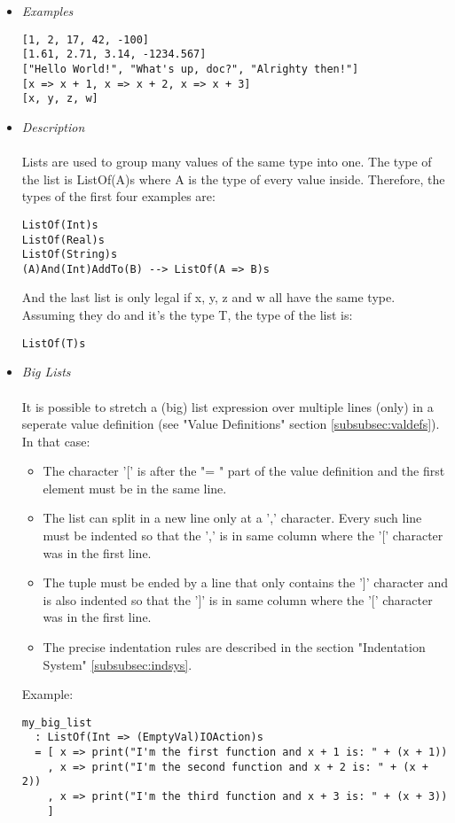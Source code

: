 \documentclass{article}
\begin{document}
\begin{itemize}

\item \textit{Examples}
\begin{verbatim}
[1, 2, 17, 42, -100]
[1.61, 2.71, 3.14, -1234.567]
["Hello World!", "What's up, doc?", "Alrighty then!"]
[x => x + 1, x => x + 2, x => x + 3]
[x, y, z, w]
\end{verbatim}

\item \textit{Description} \\\\
Lists are used to group many values of the same type into one. 
The type of the list is ListOf(A)s where A is the type of every value inside.
Therefore, the types of the first four examples are:
\begin{verbatim}
ListOf(Int)s
ListOf(Real)s
ListOf(String)s
(A)And(Int)AddTo(B) --> ListOf(A => B)s
\end{verbatim}
And the last list is only legal if x, y, z and w all have the same type. Assuming 
they do and it's the type T, the type of the list is: 
\begin{verbatim}
ListOf(T)s
\end{verbatim}

\item \textit{Big Lists} \\\\
It is possible to stretch a (big) list expression over multiple lines (only) in
a seperate value definition (see "Value Definitions" section
\ref{subsubsec:valdefs}).  In that case:
\begin{itemize}
\item
The character '[' is after the "= " part of the value definition
and the first element must be in the same line.

\item
The list can split in a new line only at a ',' character. Every such line must
be indented so that the ',' is in same column where the '[' character was in
the first line.

\item
The tuple must be ended by a line that only contains the ']' character and is 
also indented so that the ']' is in same column where the '[' character was in
the first line.

\item
The precise indentation rules are described in the section
"Indentation System" \ref{subsubsec:indsys}.
\end{itemize}
Example:
\begin{verbatim}
my_big_list
  : ListOf(Int => (EmptyVal)IOAction)s
  = [ x => print("I'm the first function and x + 1 is: " + (x + 1))
    , x => print("I'm the second function and x + 2 is: " + (x + 2))
    , x => print("I'm the third function and x + 3 is: " + (x + 3))
    ]
\end{verbatim}


\end{itemize}
\end{document}
